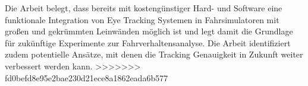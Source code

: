 Die Arbeit belegt, dass bereits mit kostengünstiger Hard- und Software eine funktionale Integration von Eye Tracking Systemen in Fahrsimulatoren mit großen und gekrümmten Leinwänden möglich ist und legt damit die Grundlage für zukünftige Experimente zur Fahrverhaltensanalyse. Die Arbeit identifiziert zudem potentielle Ansätze, mit denen die Tracking Genauigkeit in Zukunft weiter verbessert werden kann. 
>>>>>>> fd0befd8e95e2bae230d21ece8a1862eada6b577
